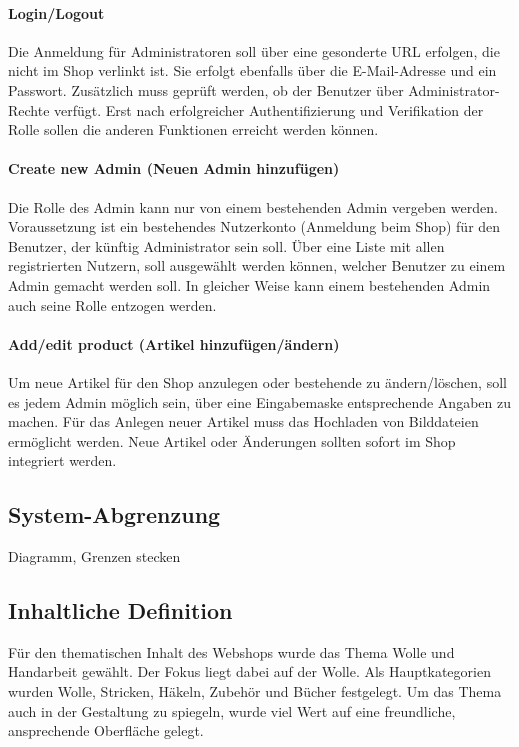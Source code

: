 \paragraph{Login/Logout}$\;$ \\
Die Anmeldung für Administratoren soll über eine gesonderte URL erfolgen, die nicht im Shop verlinkt ist.
Sie erfolgt ebenfalls über die E-Mail-Adresse und ein Passwort. Zusätzlich muss geprüft werden, ob der Benutzer über Administrator-Rechte verfügt.
Erst nach erfolgreicher Authentifizierung und Verifikation der Rolle sollen die anderen Funktionen erreicht werden können.
\paragraph{Create new Admin (Neuen Admin hinzufügen)}$\;$ \\
Die Rolle des Admin kann nur von einem bestehenden Admin vergeben werden.
Voraussetzung ist ein bestehendes Nutzerkonto (Anmeldung beim Shop) für den Benutzer, der künftig Administrator sein soll.
Über eine Liste mit allen registrierten Nutzern, soll ausgewählt werden können, welcher Benutzer zu einem Admin gemacht werden soll.
In gleicher Weise kann einem bestehenden Admin auch seine Rolle entzogen werden.
\paragraph{Add/edit product (Artikel hinzufügen/ändern)}$\;$ \\
Um neue Artikel für den Shop anzulegen oder bestehende zu ändern/löschen, soll es jedem Admin möglich sein, über eine Eingabemaske entsprechende Angaben zu machen.
Für das Anlegen neuer Artikel muss das Hochladen von Bilddateien ermöglicht werden.
Neue Artikel oder Änderungen sollten sofort im Shop integriert werden.
\subsection{System-Abgrenzung}
Diagramm, Grenzen stecken
\subsection{Inhaltliche Definition}
Für den thematischen Inhalt des Webshops wurde das Thema Wolle und Handarbeit gewählt.
Der Fokus liegt dabei auf der Wolle. Als Hauptkategorien wurden Wolle, Stricken, Häkeln, Zubehör und Bücher festgelegt.
Um das Thema auch in der Gestaltung zu spiegeln, wurde viel Wert auf eine freundliche, ansprechende Oberfläche gelegt.

